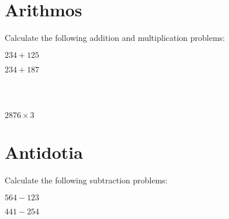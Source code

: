 \documentclass[letterpaper,12pt]{article}
\begin{document}
	\section{Arithmos}
		Calculate the following addition and multiplication problems:

		\begin{minipage}{0.5\textwidth}
			\begin{minipage}{0.25\textwidth}
				$234 + 125$
			\end{minipage}
			\begin{minipage}{0.75\textwidth}
			\end{minipage}
		\end{minipage}
		\begin{minipage}{0.5\textwidth}
			\begin{minipage}{0.25\textwidth}
				$234 + 187$
			\end{minipage}
			\begin{minipage}{0.75\textwidth}
			\end{minipage}
		\end{minipage}
		\\\\
		\begin{minipage}{0.5\textwidth}
			\begin{minipage}{0.25\textwidth}
				$2876 \times 3$
			\end{minipage}
			\begin{minipage}{0.75\textwidth}
			\end{minipage}
		\end{minipage}
	\section{Antidotia}
		Calculate the following subtraction problems:

		\begin{minipage}{0.5\textwidth}
			\begin{minipage}{0.25\textwidth}
				$564 - 123$
			\end{minipage}
			\begin{minipage}{0.75\textwidth}
			\end{minipage}
		\end{minipage}
		\begin{minipage}{0.5\textwidth}
			\begin{minipage}{0.25\textwidth}
				$441 - 254$
			\end{minipage}
			\begin{minipage}{0.75\textwidth}
			\end{minipage}
		\end{minipage}
\end{document}
